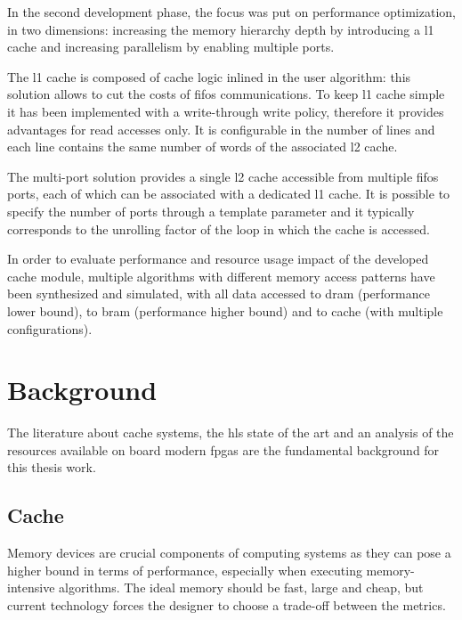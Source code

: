 \documentclass[11pt,a4paper,oneside]{memoir}
\begin{document}
\bigskip
In the second development phase, the focus was put on performance optimization,
in two dimensions: increasing the memory hierarchy depth by introducing a
\ac{l1} cache and increasing parallelism by enabling multiple ports.

The \ac{l1} cache is composed of cache logic inlined in the user algorithm: this
solution allows to cut the costs of \acp{fifo} communications. To keep \ac{l1}
cache simple it has been implemented with a write-through write policy,
therefore it provides advantages for read accesses only. It is configurable in
the number of lines and each line contains the same number of words of the
associated \ac{l2} cache.

The multi-port solution provides a single \ac{l2} cache accessible from multiple
\acp{fifo} ports, each of which can be associated with a dedicated \ac{l1}
cache.
It is possible to specify the number of ports through a template parameter and
it typically corresponds to the unrolling factor of the loop in which the cache
is accessed.

\bigskip
In order to evaluate performance and resource usage impact of the developed
cache module, multiple algorithms with different memory access patterns have
been synthesized and simulated, with all data accessed to \ac{dram} (performance
lower bound), to \ac{bram} (performance higher bound) and to cache (with
multiple configurations).

\vfill
\pagebreak

\tableofcontents*
\vfill
\pagebreak

\listoffigures
\vfill
\pagebreak

\listoftables
\vfill
\pagebreak

\printacronyms[heading=chapter,name={List of Acronyms}]
\vfill
\pagebreak

\clearpage
\pagestyle{centerruled}

\mainmatter
\chapter{Background}
The literature about cache systems, the \acl{hls} state of the art and an
analysis of the resources available on board modern \acp{fpga} are the
fundamental background for this thesis work.

\section{Cache}
Memory devices are crucial components of computing systems as they can pose a
higher bound in terms of performance, especially when executing memory-intensive
algorithms.
The ideal memory should be fast, large and cheap, but current technology forces
the designer to choose a trade-off between the metrics.
\end{document}

